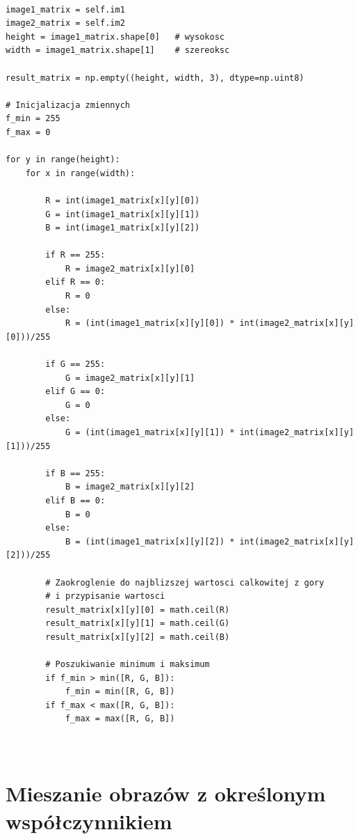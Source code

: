\documentclass[final,a4paper,openany,12pt]{mwbk}
\begin{document}
\begin{lstlisting}[caption=Mnożenie obrazu barwowego przez inny obraz ]

image1_matrix = self.im1
image2_matrix = self.im2
height = image1_matrix.shape[0]   # wysokosc
width = image1_matrix.shape[1]    # szereoksc

result_matrix = np.empty((height, width, 3), dtype=np.uint8)

# Inicjalizacja zmiennych
f_min = 255
f_max = 0

for y in range(height):
    for x in range(width):  

        R = int(image1_matrix[x][y][0])
        G = int(image1_matrix[x][y][1])
        B = int(image1_matrix[x][y][2])

        if R == 255:
            R = image2_matrix[x][y][0]
        elif R == 0:
            R = 0
        else:
            R = (int(image1_matrix[x][y][0]) * int(image2_matrix[x][y][0]))/255 
        
        if G == 255:
            G = image2_matrix[x][y][1]
        elif G == 0:
            G = 0
        else:
            G = (int(image1_matrix[x][y][1]) * int(image2_matrix[x][y][1]))/255 
        
        if B == 255:
            B = image2_matrix[x][y][2]
        elif B == 0:
            B = 0
        else:
            B = (int(image1_matrix[x][y][2]) * int(image2_matrix[x][y][2]))/255 

        # Zaokroglenie do najblizszej wartosci calkowitej z gory
        # i przypisanie wartosci
        result_matrix[x][y][0] = math.ceil(R)
        result_matrix[x][y][1] = math.ceil(G)
        result_matrix[x][y][2] = math.ceil(B)

        # Poszukiwanie minimum i maksimum                
        if f_min > min([R, G, B]):
            f_min = min([R, G, B])
        if f_max < max([R, G, B]):
            f_max = max([R, G, B])



\end{lstlisting}


\section{ Mieszanie obrazów z określonym współczynnikiem}

\hfill
\\\\
\indent
\end{document}
